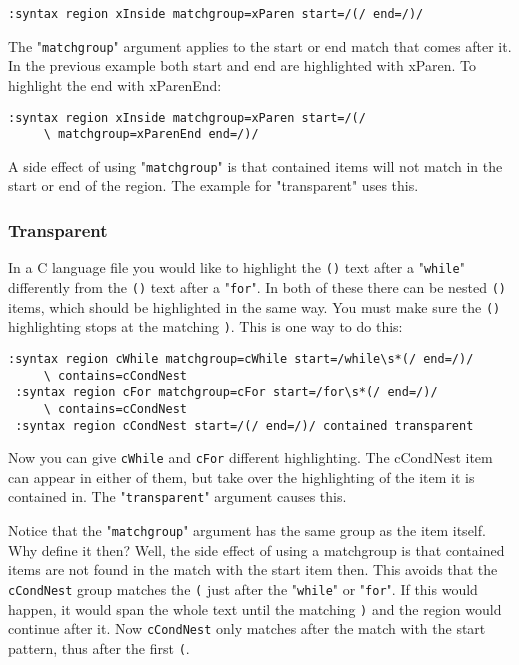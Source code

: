 \begin{Verbatim}[samepage=true]
 :syntax region xInside matchgroup=xParen start=/(/ end=/)/
\end{Verbatim}

The "\texttt{matchgroup}" argument applies to the start or end match that comes after it.
In the previous example both start and end are highlighted with xParen.
To highlight the end with xParenEnd:

\begin{Verbatim}[samepage=true]
 :syntax region xInside matchgroup=xParen start=/(/
     \ matchgroup=xParenEnd end=/)/
\end{Verbatim}

A side effect of using "\texttt{matchgroup}" is that contained items will not match in the start or end of the region.
The example for "transparent" uses this.

\subsubsection{Transparent}
In a C language file you would like to highlight the \texttt{()} text after a "\texttt{while}" differently from the \texttt{()} text after a "\texttt{for}".
In both of these there can be nested \texttt{()} items, which should be highlighted in the same way.
You must make sure the \texttt{()} highlighting stops at the matching \texttt{)}.
This is one way to do this:

\begin{Verbatim}[samepage=true]
 :syntax region cWhile matchgroup=cWhile start=/while\s*(/ end=/)/
     \ contains=cCondNest
 :syntax region cFor matchgroup=cFor start=/for\s*(/ end=/)/
     \ contains=cCondNest
 :syntax region cCondNest start=/(/ end=/)/ contained transparent
\end{Verbatim}

Now you can give \texttt{cWhile} and \texttt{cFor} different highlighting.
The cCondNest item can appear in either of them, but take over the highlighting of the item it is contained in.
The "\texttt{transparent}" argument causes this.

Notice that the "\texttt{matchgroup}" argument has the same group as the item itself.
Why define it then?  Well, the side effect of using a matchgroup is that contained items are not found in the match with the start item then.
This avoids that the \texttt{cCondNest} group matches the \texttt{(} just after the "\texttt{while}" or "\texttt{for}".
If this would happen, it would span the whole text until the matching \texttt{)} and the region would continue after it.
Now \texttt{cCondNest} only matches after the match with the start pattern, thus after the first \texttt{(}.

